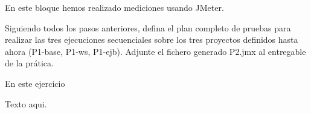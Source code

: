 \documentclass[a4paper, 12pt, spanish]{memoria}
\begin{document}
\portada{}
\indice{}

En este bloque hemos realizado mediciones usando JMeter.


Siguiendo todos los pasos anteriores, defina el plan completo de pruebas para realizar las tres ejecuciones secuenciales sobre los tres proyectos definidos hasta ahora (P1-base, P1-ws, P1-ejb). Adjunte el fichero generado P2.jmx al entregable de la prática.

En este ejercicio

Texto aqui.
\end{document}
